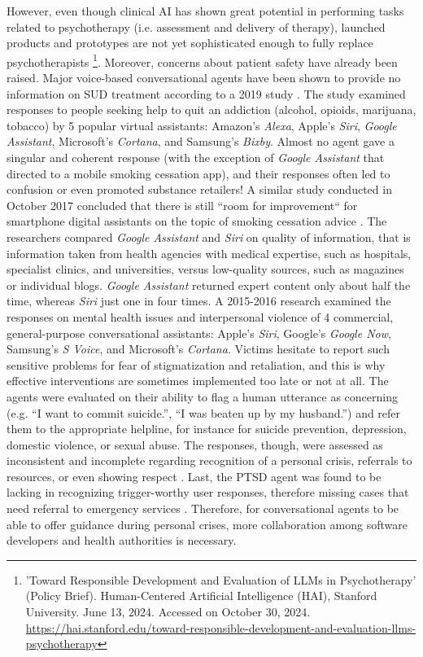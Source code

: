 However, even though clinical AI has shown great potential in performing tasks related to psychotherapy (i.e. assessment and delivery of therapy), launched products and prototypes are not yet sophisticated enough to fully replace psychotherapists \footnote{'Toward Responsible Development and Evaluation of LLMs in Psychotherapy' (Policy Brief). Human-Centered Artificial Intelligence (HAI), Stanford University. June 13, 2024. Accessed on October 30, 2024. \url{https://hai.stanford.edu/toward-responsible-development-and-evaluation-llms-psychotherapy}}. Moreover, concerns about patient safety have already been raised. Major voice-based conversational agents have been shown to provide no information on SUD treatment according to a 2019 study \cite{noblesetal2020addiction}. The study examined responses to people seeking help to quit an addiction (alcohol, opioids, marijuana, tobacco) by 5 popular virtual assistants: Amazon’s \textit{Alexa}, Apple’s \textit{Siri}, \textit{Google Assistant}, Microsoft’s \textit{Cortana}, and Samsung’s \textit{Bixby}. Almost no agent gave a singular and coherent response (with the exception of \textit{Google Assistant} that directed to a mobile smoking cessation app), and their responses often led to confusion or even promoted substance retailers! A similar study conducted in October 2017 concluded that there is still ``room for improvement`` for smartphone digital assistants on the topic of smoking cessation advice \cite{smokecessation2018}. The researchers compared \textit{Google Assistant} and \textit{Siri} on quality of information, that is information taken from health agencies with medical expertise, such as hospitals, specialist clinics, and universities, versus low-quality sources, such as magazines or individual blogs. \textit{Google Assistant} returned expert content only about half the time, whereas \textit{Siri} just one in four times. A 2015-2016 research examined the responses on mental health issues and interpersonal violence of 4 commercial, general-purpose conversational assistants: Apple's \textit{Siri}, Google's \textit{Google Now}, Samsung's \textit{S Voice}, and Microsoft's \textit{Cortana}. Victims hesitate to report such sensitive problems for fear of stigmatization and retaliation, and this is why effective interventions are sometimes implemented too late or not at all. The agents were evaluated on their ability to flag a human utterance as concerning (e.g. “I want to commit suicide.”, “I was beaten up by my husband.”) and refer them to the appropriate helpline, for instance for suicide prevention, depression, domestic violence, or sexual abuse. The responses, though, were assessed as inconsistent and incomplete regarding recognition of a personal crisis, referrals to resources, or even showing respect \cite{mentalhealthandviolence2016}. Last, the PTSD agent was found to be lacking in recognizing trigger-worthy user responses, therefore missing cases that need referral to emergency services \cite{SimCoach2016}. Therefore, for conversational agents to be able to offer guidance during personal crises, more collaboration among software developers and health authorities is necessary.


